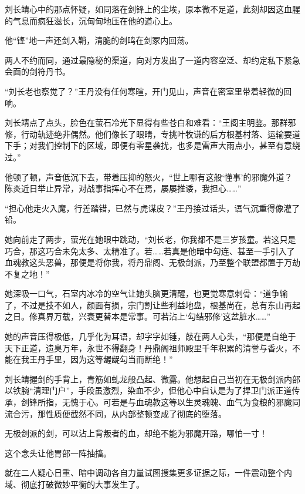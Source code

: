 刘长靖心中的那点怀疑，如同落在剑锋上的尘埃，原本微不足道，此刻却因这血腥的气息而疯狂滋长，沉甸甸地压在他的道心上。

他“铿”地一声还剑入鞘，清脆的剑鸣在剑冢内回荡。

两人不约而同，通过最隐秘的渠道，向对方发出了一道内容空泛、却约定私下紧急会面的剑符丹书。

\vspace{2em}

“刘长老也察觉了？”王丹没有任何寒暄，开门见山，声音在密室里带着轻微的回响。

刘长靖点了点头，脸色在萤石冷光下显得有些苍白和难看：“王阁主明鉴。那群邪修，行动轨迹绝非偶然。他们像长了眼睛，专挑叶牧谦的后方根基村落、运输要道下手；对我们控制下的区域，即便有零星袭扰，也多是雷声大雨点小，甚至有意绕过。”

他顿了顿，声音低沉下去，带着压抑的怒火，“世上哪有这般‘懂事’的邪魔外道？陈炎近日举止异常，对战事指挥心不在焉，屡屡推诿，我担心……”

“担心他走火入魔，行差踏错，已然与虎谋皮？”王丹接过话头，语气沉重得像灌了铅。

她向前走了两步，萤光在她眼中跳动，“刘长老，你我都不是三岁孩童。若这只是巧合，那这巧合未免太多、太精准了。若……若真是他暗中勾连、甚至一手引入了血魂教这头恶兽，那便是将你我，将丹鼎阁、无极剑派，乃至整个联盟都置于万劫不复之地！”

她深吸一口气，石室内冰冷的空气让她头脑更清醒，也更觉寒意刺骨：“道争输了，不过是技不如人，颜面有损，宗门割让些利益地盘，根基尚在，总有东山再起之日。修真界万载，兴衰更替本是常事。可若沾上‘勾结邪修’这盆脏水……”

她的声音压得极低，几乎化为耳语，却字字如锤，敲在两人心头，“那便是自绝于天下正道，遗臭万年，永世不得翻身！丹鼎阁祖师殿里千年积累的清誉与香火，不能在我王丹手里，因为这等龌龊勾当而断绝！”

刘长靖握剑的手背上，青筋如虬龙般凸起、微露。他想起自己当初在无极剑派内部以铁腕“清理门户”，手段虽激烈，染血不少，但他心中自认是为了捍卫门派正道传承，剑锋所指，无愧于心。可若是与血魂教这等以生灵魂魄、血气为食粮的邪魔同流合污，那性质便截然不同，从内部整顿变成了彻底的堕落。

无极剑派的剑，可以沾上背叛者的血，却绝不能为邪魔开路，哪怕一寸！

这个念头让他胃部一阵抽搐。

\vspace{2em}

就在二人疑心日重、暗中调动各自力量试图搜集更多证据之际，一件震动整个内域、彻底打破微妙平衡的大事发生了。

